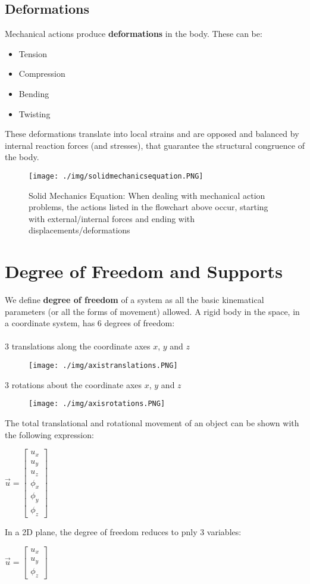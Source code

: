 \subsection{Deformations}
Mechanical actions produce \textbf{deformations} in the body. These can be:
\begin{itemize}[noitemsep]
  \item Tension
  \item Compression
  \item Bending
  \item Twisting
\end{itemize}
These deformations translate into local strains and are opposed and balanced by internal reaction forces (and stresses), that guarantee the structural congruence of the body.
\begin{figure}[H]
  \centering
  \texttt{[image: ./img/solidmechanicsequation.PNG]}
  \caption{Solid Mechanics Equation: When dealing with mechanical action problems, the actions listed in the flowchart above occur, starting with external/internal forces and ending with displacements/deformations}
\end{figure}
\section{Degree of Freedom and Supports}
We define \textbf{degree of freedom} of a system as all the basic kinematical parameters (or all the forms of movement) allowed. A rigid body in the space, in a coordinate system, has 6 degrees of freedom: \\\\
3 translations along the coordinate axes $x$, $y$ and $z$
\begin{figure}[H]
  \centering
  \texttt{[image: ./img/axistranslations.PNG]}
\end{figure}
3 rotations about the coordinate axes $x$, $y$ and $z$
\begin{figure}[H]
  \centering
  \texttt{[image: ./img/axisrotations.PNG]}
\end{figure}
The total translational and rotational movement of an object can be shown with the following expression:
\begin{center}
  $\vec{u} = \left[ \begin{array}{cccccc} u_x \\ u_y \\ u_z \\ \phi_x \\ \phi_y \\ \phi_z \end{array}\right]$
\end{center}
In a 2D plane, the degree of freedom reduces to pnly 3 variables:
\begin{center}
  $\vec{u} = \left[ \begin{array}{ccc} u_x \\ u_y \\ \phi_z \end{array}\right]$
\end{center}
